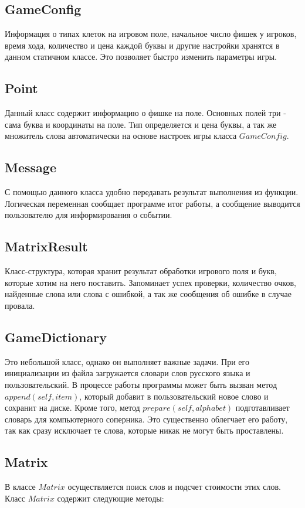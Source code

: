 \documentclass[a4paper,14pt]{article}
\begin{document}
	\subsection{GameConfig}
	Информация о типах клеток на игровом поле, начальное число фишек у игроков, время хода, количество и цена каждой буквы и другие настройки хранятся в данном статичном классе. Это позволяет быстро изменить параметры игры.
	
	\subsection{Point}
	Данный класс содержит информацию о фишке на поле. Основных полей три - сама буква и координаты на поле. Тип определяется и цена буквы, а так же множитель слова автоматически на основе настроек игры класса $GameConfig$.
	
	\subsection{Message}
	С помощью данного класса удобно передавать результат выполнения из функции. Логическая переменная сообщает программе итог работы, а сообщение выводится пользователю для информирования о событии.
	
	\subsection{MatrixResult}
	Класс-структура, которая хранит результат обработки игрового поля и букв, которые хотим на него поставить. Запоминает успех проверки, количество очков, найденные слова или слова с ошибкой, а так же сообщения об ошибке в случае провала.
		
	\subsection{GameDictionary}
	Это небольшой класс, однако он выполняет важные задачи. При его инициализации из файла загружается словари слов русского языка и пользовательский. В процессе работы программы может быть вызван метод $append(self, item)$, который добавит в пользовательский новое слово и сохранит на диске. Кроме того, метод $prepare(self, alphabet)$ подготавливает словарь для компьютерного соперника. Это существенно облегчает его работу, так как сразу исключает те слова, которые никак не могут быть проставлены.
	\subsection{Matrix}
	В классе $Matrix$ осуществляется поиск слов и подсчет стоимости этих слов. Класс $Matrix$ содержит следующие методы: 
	
\end{document}
